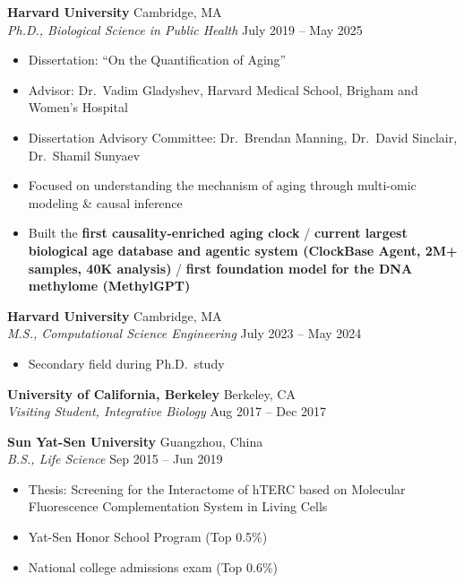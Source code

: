 \documentclass[
  11pt,
]
{article}
\providecommand{\tightlist}{%
  \setlength{\itemsep}{0pt}\setlength{\parskip}{0pt}}
\begin{document}
\textbf{Harvard University} \hfill Cambridge, MA\\
\emph{Ph.D., Biological Science in Public Health} \hfill July 2019 --
May 2025

\vspace{-0.5\baselineskip}

\begin{itemize}
\tightlist
\item
  Dissertation: ``On the Quantification of Aging''
\item
  Advisor: Dr.~Vadim Gladyshev, Harvard Medical School, Brigham and
  Women's Hospital
\item
  Dissertation Advisory Committee: Dr.~Brendan Manning, Dr.~David
  Sinclair, Dr.~Shamil Sunyaev
\item
  Focused on understanding the mechanism of aging through multi-omic
  modeling \& causal inference
\item
  Built the \textbf{first causality-enriched aging clock} /
  \textbf{current largest biological age database and agentic system
  (ClockBase Agent, 2M+ samples, 40K analysis)} / \textbf{first
  foundation model for the DNA methylome (MethylGPT)}
\end{itemize}

\textbf{Harvard University} \hfill Cambridge, MA\\
\emph{M.S., Computational Science Engineering} \hfill July 2023 -- May
2024

\vspace{-0.5\baselineskip}

\begin{itemize}
\tightlist
\item
  Secondary field during Ph.D.~study
\end{itemize}

\textbf{University of California, Berkeley} \hfill Berkeley, CA\\
\emph{Visiting Student, Integrative Biology} \hfill Aug 2017 -- Dec 2017

\textbf{Sun Yat-Sen University} \hfill Guangzhou, China\\
\emph{B.S., Life Science} \hfill Sep 2015 -- Jun 2019

\vspace{-0.5\baselineskip}

\begin{itemize}
\tightlist
\item
  Thesis: Screening for the Interactome of hTERC based on Molecular
  Fluorescence Complementation System in Living Cells
\item
  Yat-Sen Honor School Program (Top 0.5\%)
\item
  National college admissions exam (Top 0.6\%)
\end{itemize}
\end{document}
